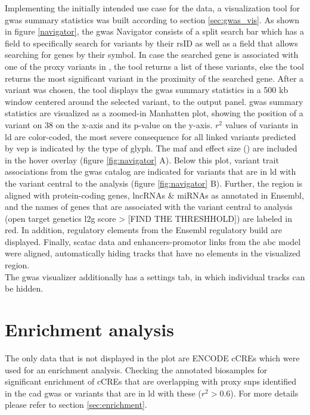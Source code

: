     Implementing the initially intended use case for the data, a visualization tool for \ac{gwas} summary statistics was built according to section \ref{sec:gwas_vis}. As shown in figure \ref{navigator}, the \ac{gwas} Navigator consists of a split search bar which has a field to specifically search for variants by their rsID as well as a field that allows searching for genes by their symbol. In case the searched gene is associated with one of the proxy variants in \textcite{aragamDiscoverySystematicCharacterization2021}, the tool returns a list of these variants, else the tool returns the most significant variant in the proximity of the searched gene. After a variant was chosen, the tool displays the \ac{gwas} summary statistics in a 500 kb window centered around the selected variant, to the output panel. \ac{gwas} summary statistics are visualized as a zoomed-in Manhatten plot, showing the position of a variant on \ac{38} on the x-axis and its p-value on the y-axis. $r^2$ values of variants in \ac{ld} are color-coded, the most severe consequence for all linked variants predicted by \ac{vep} is indicated by the type of glyph. The \ac{maf} and effect size (\beta) are included in the hover overlay (figure \ref{fig:navigator} A). Below this plot, variant trait associations from the \ac{gwas} catalog are indicated for variants that are in \ac{ld} with the variant central to the analysis (figure \ref{fig:navigator} B). Further, the region is aligned with protein-coding genes, lncRNAs \& miRNAs as annotated in Ensembl, and the names of genes that are associated with the variant central to analysis (open target genetics \ac{l2g} score > [FIND THE THRESHHOLD]) are labeled in red. In addition, regulatory elements from the Ensembl regulatory build are displayed. Finally, sc\ac{atac} data and enhancers-promotor links from the \ac{abc} model were aligned, automatically hiding tracks that have no elements in the visualized region.\\
    The \ac{gwas} visualizer additionally has a settings tab, in which individual tracks can be hidden.

\section{Enrichment analysis}
\label{sec:result_enrichment}
The only data that is not displayed in the plot are ENCODE \acp{cCRE} which were used for an enrichment analysis. Checking the annotated biosamples for significant enrichment of \acp{cCRE} that are overlapping with proxy \acp{snp} identified in the \ac{cad} \ac{gwas} or variants that are in \ac{ld} with these ($r^2 > 0.6$). For more details please refer to section \ref{sec:enrichment}.

